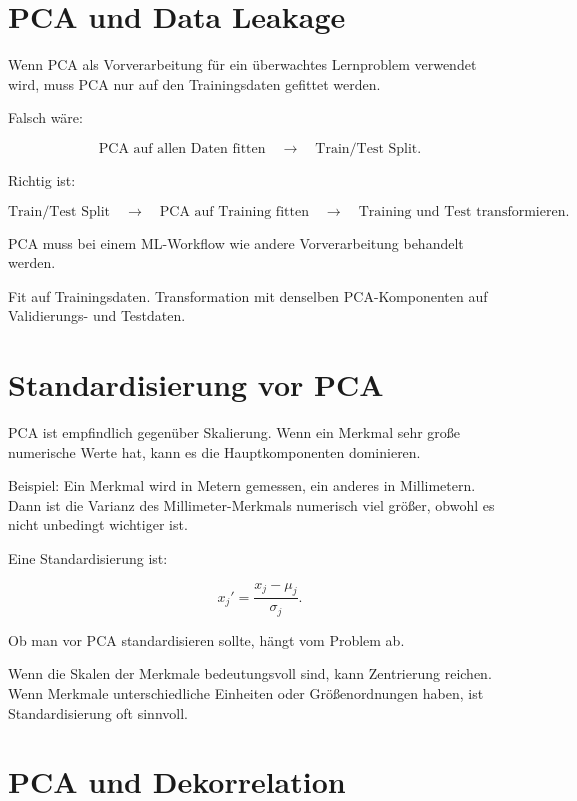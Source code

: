 \section{PCA und Data Leakage}

Wenn PCA als Vorverarbeitung für ein überwachtes Lernproblem verwendet wird, muss PCA nur auf den Trainingsdaten gefittet werden.

Falsch wäre:

\[
    \text{PCA auf allen Daten fitten}
    \quad
    \rightarrow
    \quad
    \text{Train/Test Split}.
\]

Richtig ist:

\[
    \text{Train/Test Split}
    \quad
    \rightarrow
    \quad
    \text{PCA auf Training fitten}
    \quad
    \rightarrow
    \quad
    \text{Training und Test transformieren}.
\]

\begin{examtipbox}
PCA muss bei einem ML-Workflow wie andere Vorverarbeitung behandelt werden.

Fit auf Trainingsdaten.
Transformation mit denselben PCA-Komponenten auf Validierungs- und Testdaten.
\end{examtipbox}

\section{Standardisierung vor PCA}

PCA ist empfindlich gegenüber Skalierung.
Wenn ein Merkmal sehr große numerische Werte hat, kann es die Hauptkomponenten dominieren.

Beispiel:
Ein Merkmal wird in Metern gemessen, ein anderes in Millimetern.
Dann ist die Varianz des Millimeter-Merkmals numerisch viel größer, obwohl es nicht unbedingt wichtiger ist.

Eine Standardisierung ist:

\[
    x_j'
    =
    \frac{x_j-\mu_j}{\sigma_j}.
\]

\begin{notebox}
Ob man vor PCA standardisieren sollte, hängt vom Problem ab.

Wenn die Skalen der Merkmale bedeutungsvoll sind, kann Zentrierung reichen.
Wenn Merkmale unterschiedliche Einheiten oder Größenordnungen haben, ist Standardisierung oft sinnvoll.
\end{notebox}

\section{PCA und Dekorrelation}

